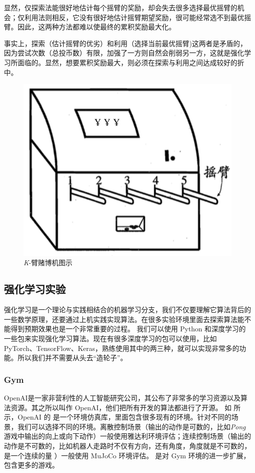 显然，仅探索法能很好地估计每个摇臂的奖励，却会失去很多选择最优摇臂的机会；仅利用法则相反，它没有很好地估计摇臂期望奖励，很可能经常选不到最优摇臂。因此，这两种方法都难以使最终的累积奖励最大化。

事实上，探索（估计摇臂的优劣）和利用（选择当前最优摇臂)这两者是矛盾的，因为尝试次数（总投币数）有限，加强了一方则自然会削弱另一方，这就是强化学习所面临的。显然，想要累积奖励最大，则必须在探索与利用之间达成较好的折中。

\begin{figure}[htb]
    \centering
    \includegraphics[width=0.5\linewidth]{res/ch1/1.39}
    \caption{\textit{K}-臂赌博机图示}
    \label{fig:fig1.39}
\end{figure}

\subsection{强化学习实验} 
强化学习是一个理论与实践相结合的机器学习分支，我们不仅要理解它算法背后的一些数学原理，还要通过上机实践实现算法。在很多实验环境里面去探索算法能不能得到预期效果也是一个非常重要的过程。
我们可以使用 Python 和深度学习的一些包来实现强化学习算法。现在有很多深度学习的包可以使用，比如 PyTorch、TensorFlow、Keras，熟练使用其中的两三种，就可以实现非常多的功能。所以我们并不需要从头去“造轮子”。
\subsubsection{Gym} 
OpenAI是一家非营利性的人工智能研究公司，其公布了非常多的学习资源以及算法资源。其之所以叫作 OpenAI，他们把所有开发的算法都进行了开源。
如 所示，OpenAI 的 是一个环境仿真库，里面包含很多现有的环境。针对不同的场景，我们可以选择不同的环境。离散控制场景（输出的动作是可数的，比如\textit{Pong}游戏中输出的向上或向下动作）一般使用雅达利环境评估；连续控制场景（输出的动作是不可数的，比如机器人走路时不仅有方向，还有角度，角度就是不可数的，是一个连续的量 ）一般使用 MuJoCo 环境评估。 是对 Gym 环境的进一步扩展，包含更多的游戏。

